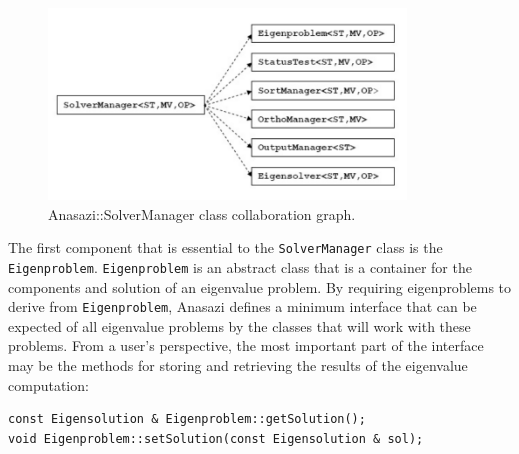 \documentclass[acmtoms]{acmtrans2m}
\newcommand{\aspace}[1]{\texttt{#1}}
\begin{document}
\begin{figure}[htb]
\label{fig:solverColl}
\begin{center}
\includegraphics[height=2in]{anasazi_slvr_collaborations.pdf}
\end{center}
\caption{Anasazi::SolverManager class collaboration graph.}
\end{figure}

The first component that is essential to the \aspace{SolverManager} class is the 
\aspace{Eigenproblem}.  \aspace {Eigenproblem} is an abstract class that is a container for 
the components and solution of an eigenvalue problem. By requiring eigenproblems to derive from
\aspace{Eigenproblem}, Anasazi defines a minimum interface that can be expected of all
eigenvalue problems by the classes that will work with these problems. From a user's perspective,
the most important part of the interface may be the methods for storing and retrieving the 
results of the eigenvalue computation:
\begin{verbatim}
const Eigensolution & Eigenproblem::getSolution();
void Eigenproblem::setSolution(const Eigensolution & sol);
\end{verbatim}
\end{document}
